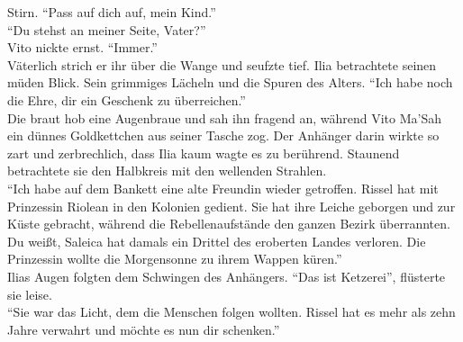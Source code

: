 Stirn. ``Pass auf dich auf, mein Kind.''\\
``Du stehst an meiner Seite, Vater?''\\
Vito nickte ernst. ``Immer.''\\
Väterlich strich er ihr über die Wange und seufzte tief. Ilia betrachtete seinen müden Blick. Sein 
grimmiges Lächeln und die Spuren des Alters. ``Ich habe noch die Ehre, dir ein Geschenk zu 
überreichen.''\\
Die braut hob eine Augenbraue und sah ihn fragend an, während Vito Ma'Sah ein dünnes Goldkettchen 
aus seiner Tasche zog. Der Anhänger darin wirkte so zart und zerbrechlich, dass Ilia kaum wagte es 
zu berührend. Staunend betrachtete sie den Halbkreis mit den wellenden Strahlen.\\
``Ich habe auf dem Bankett eine alte Freundin wieder getroffen. Rissel hat mit Prinzessin Riolean in 
den Kolonien gedient. Sie hat ihre Leiche geborgen und zur Küste gebracht, während die 
Rebellenaufstände den ganzen Bezirk überrannten. Du weißt, Saleica hat damals ein Drittel des 
eroberten Landes verloren. Die Prinzessin wollte die Morgensonne zu ihrem Wappen küren.''\\
Ilias Augen folgten dem Schwingen des Anhängers. ``Das ist Ketzerei'', flüsterte sie leise.\\
``Sie war das Licht, dem die Menschen folgen wollten. Rissel hat es mehr als zehn Jahre verwahrt 
und möchte es nun dir schenken.''\\



